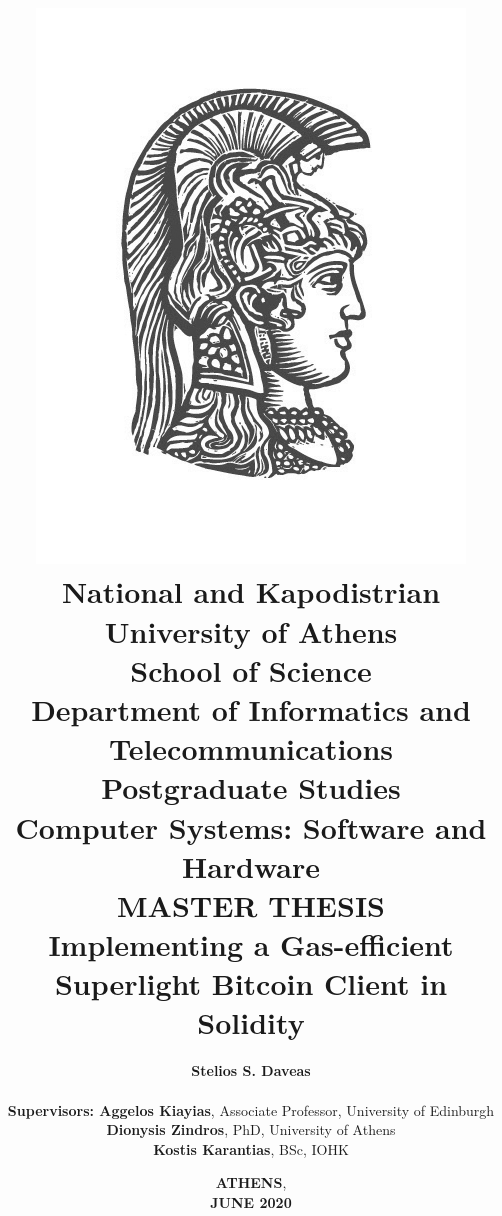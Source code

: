 \title{
    {\includegraphics[scale=0.7]{figures/logo_uoa.jpg}}\\
    {\Large \textbf{National and Kapodistrian University of Athens \\
    School of Science}} \\
    {\large \textbf{Department of Informatics and Telecommunications}}\\
    \vspace{1cm}
    {\large \textbf{Postgraduate Studies}} \\
    {\large \textbf{Computer Systems: Software and Hardware}}\\
    \vspace{5mm}
    {\large \textbf{MASTER THESIS}}\\
    \vspace{3mm}
    {\textbf{\Large Implementing a Gas-efficient\\Superlight Bitcoin Client in Solidity}}
    }

\author{

    \hspace{-1.5cm}
    \textbf{\normalsize Stelios S. Daveas}\\

    \vspace{0.8cm} \\
    \textbf{\normalsize Supervisors: Aggelos Kiayias}, \normalsize Associate Professor, University of Edinburgh\\
    \hspace{-0.70cm}
    \textbf{\normalsize Dionysis Zindros}, \normalsize PhD, University of Athens\\
    \hspace{-3.50cm}
    \textbf{\normalsize Kostis Karantias}, \normalsize BSc, IOHK
}

\date{\textbf{ATHENS}, \\ \textbf{JUNE 2020}}

